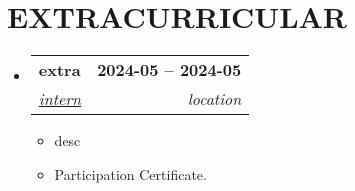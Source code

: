 \documentclass[letterpaper,11pt]{article}
\makeatletter
\newcommand{\resumeItem}[1]{
        \item\small{
          {#1 \vspace{-2pt}}
        }
      }
\newcommand{\resumeSubheading}[4]{
        \vspace{-2pt}\item
          \begin{tabular*}{1.0\textwidth}[t]{l@{\extracolsep{\fill}}r}
            \textbf{\large#1} & \textbf{\small #2} \\
            \textit{\large#3} & \textit{\small #4} \\
            
          \end{tabular*}\vspace{-7pt}
      }
\newcommand{\resumeSubHeadingListStart}{\begin{itemize}[leftmargin=0.0in, label={}]}
\newcommand{\resumeSubHeadingListEnd}{\end{itemize}}
\newcommand{\resumeItemListStart}{\begin{itemize}}
\newcommand{\resumeItemListEnd}{\end{itemize}\vspace{-5pt}}
\makeatother
\begin{document}
        \section{EXTRACURRICULAR}
          \resumeSubHeadingListStart
            
                \resumeSubheading{extra \href{https://link.com}{\raisebox{-0.1\height} } }{2024-05 -- 2024-05}{\underline{intern}}{location}
                \resumeItemListStart
                  \resumeItem{\normalsize{desc}}
                  \resumeItem{\normalsize{Participation Certificate. \href{https://link.com}{\raisebox{-0.1\height} }}}
                \resumeItemListEnd
              
          \resumeSubHeadingListEnd
          \vspace{-11pt}
      
        
    
        
\end{document}
